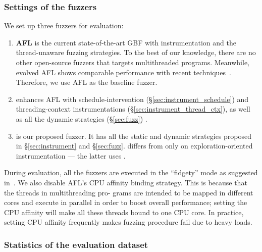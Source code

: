 \subsubsection{Settings of the fuzzers}
We set up three fuzzers for evaluation:
\begin{enumerate}[1)]
\item \textbf{AFL} is the current state-of-the-art GBF with \AFLIns instrumentation 
and the thread-unaware fuzzing strategies. To the best of our knowledge, there are no 
other open-source fuzzers that targets multithreaded programs. Meanwhile, evolved AFL 
shows comparable performance with recent techniques~\cite{ccs18_eval_fuzzing,Shastry:LNCS2017:Orthrus}. 
Therefore, we use AFL as the baseline fuzzer.

\item \textbf{\mtfuzzc} enhances AFL with schedule-intervention 
(\S\ref{sec:instrument_schedule}) and threading-context instrumentations (\S\ref{sec:instrument_thread_ctx}), as well as all the dynamic strategies (\S\ref{sec:fuzz}) .

\item \textbf{\mtfuzz} is our proposed fuzzer. It has all the static and dynamic 
strategies proposed in \S\ref{sec:instrument} and \S\ref{sec:fuzz}. \mtfuzz differs
from \mtfuzzc only on exploration-oriented instrumentation --- the latter uses \AFLIns.
\end{enumerate}

During evaluation, all the fuzzers are executed in the ``fidgety'' mode as
suggested in~\cite{FidgetyAFL}. We also disable AFL's CPU affinity binding
strategy. This is because that the threads in multithreading pro-
grams are intended to be mapped in different cores and execute in
parallel in order to boost overall performance; setting the CPU affinity will make all these threads bound to one CPU core. In practice, setting CPU affinity frequently makes fuzzing procedure fail due to heavy loads.



\subsubsection{Statistics of the evaluation dataset}

